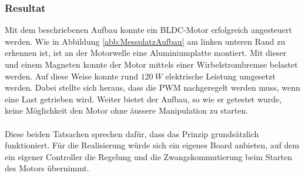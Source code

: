 \subsubsection{Resultat}
\label{chap:VersuchsResultat}
Mit dem beschriebenen Aufbau konnte ein BLDC-Motor erfolgreich angesteuert 
werden. Wie in Abbildung \ref{abb:MessplatzAufbau} am linken unteren Rand zu 
erkennen ist, ist an der Motorwelle eine Aluminiumplatte montiert. Mit dieser 
und einem Magneten konnte der Motor mittels einer Wirbelstrombremse belastet 
werden. Auf diese Weise konnte rund $120~W$ elektrische Leistung umgesetzt 
werden. Dabei stellte sich heraus, dass die PWM nachgeregelt werden muss, wenn 
eine Last getrieben wird. Weiter bietet der Aufbau, so wie er getestet wurde, 
keine Möglichkeit den Motor ohne äussere Manipulation zu starten.\\
\\
Diese beiden Tatsachen sprechen dafür, dass das Prinzip grundsätzlich 
funktioniert. Für die Realisierung würde sich ein eigenes Board anbieten, auf 
dem ein eigener Controller die Regelung und die Zwangskommutierung beim 
Starten des Motors übernimmt.
